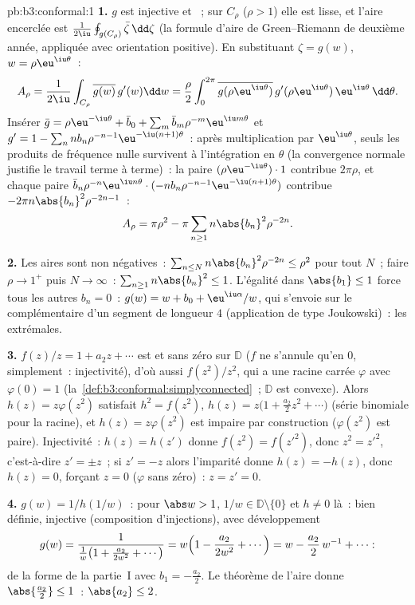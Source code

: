 \begin{solution}{pb:b3:conformal:1}
\textbf{1.} $g$ est injective et ~; sur $C_\rho$
($\rho > 1$) elle est lisse, et l'aire encerclée est
$\frac1{2\iu}\oint_{g(C_\rho)}\bar\zeta\,\dd\zeta$ (la
formule d'aire de Green--Riemann de deuxième année,
appliquée avec orientation positive). En substituant $\zeta
= g(w)$, $w = \rho\eu^{\iu\theta}$~:
\[
A_\rho = \frac1{2\iu}\int_{C_\rho}\overline{g(w)}\,g'(w)\dd
w = \frac\rho2\int_0^{2\pi}\overline{g(\rho\eu^{\iu\theta})}
\,g'(\rho\eu^{\iu\theta})\,\eu^{\iu\theta}\,\dd\theta .
\]
Insérer $\bar g = \rho\eu^{-\iu\theta} + \bar b_0 +
\sum_m\bar b_m\rho^{-m}\eu^{\iu m\theta}$ et $g' = 1 -
\sum_nnb_n\rho^{-n-1}\eu^{-\iu(n+1)\theta}$~: après
multiplication par $\eu^{\iu\theta}$, seuls les produits de
fréquence nulle survivent à l'intégration en $\theta$ (la
convergence normale justifie le travail terme à terme)~: la
paire $(\rho\eu^{-\iu\theta})\cdot1$ contribue $2\pi\rho$,
et chaque paire $\bar b_n\rho^{-n}\eu^{\iu
n\theta}\cdot(-nb_n\rho^{-n-1}\eu^{-\iu(n+1)\theta})$
contribue $-2\pi n\abs{b_n}^2\rho^{-2n-1}$~:
\[
A_\rho = \pi\rho^2 - \pi\sum_{n\geq1}n\abs{b_n}^2\rho^{-2n}.
\]

\textbf{2.} Les aires sont non négatives~: $\sum_{n\leq
N}n\abs{b_n}^2\rho^{-2n} \leq \rho^2$ pour tout $N$~; faire
$\rho \to 1^+$ puis $N \to \infty$~:
$\sum_{n\geq1}n\abs{b_n}^2 \leq 1$. L'égalité dans
$\abs{b_1} \leq 1$ force tous les autres $b_n = 0$~: $g(w) =
w + b_0 + \eu^{\iu\alpha}/w$, qui s'envoie sur le
complémentaire d'un segment de longueur $4$ (application de
type Joukowski)~: les extrémales.

\textbf{3.} $f(z)/z = 1 + a_2z + \cdots$ est  et
sans zéro sur $\mathbb D$ ($f$ ne s'annule qu'en $0$,
simplement~: injectivité), d'où aussi $f(z^2)/z^2$, qui a
une racine carrée  $\varphi$ avec $\varphi(0) =
1$ (la~\cref{def:b3:conformal:simplyconnected}~; $\mathbb D$
est convexe). Alors $h(z) = z\varphi(z^2)$ satisfait $h^2 =
f(z^2)$, $h(z) = z\bigl(1 + \frac{a_2}2z^2 + \cdots\bigr)$
(série binomiale pour la racine), et $h(z) = z\varphi(z^2)$
est impaire par construction ($\varphi(z^2)$ est paire).
Injectivité~: $h(z) = h(z')$ donne $f(z^2) = f(z'^2)$, donc
$z^2 = z'^2$, c'est-à-dire $z' = \pm z$~; si $z' = -z$ alors
l'imparité donne $h(z) = -h(z)$, donc $h(z) = 0$, forçant
$z = 0$ ($\varphi$ sans zéro)~: $z = z' = 0$.

\textbf{4.} $g(w) = 1/h(1/w)$~: pour $\abs w > 1$, $1/w \in
\mathbb D\setminus\{0\}$ et $h \neq 0$ là~: bien définie,
injective (composition d'injections), avec développement
\[
g(w) = \frac{1}{\frac1w\bigl(1 + \frac{a_2}{2w^2} +
\cdots\bigr)} = w\Bigl(1 - \frac{a_2}{2w^2} + \cdots\Bigr)
= w - \frac{a_2}{2}\,w^{-1} + \cdots :
\]
de la forme de la partie~I avec $b_1 = -\frac{a_2}2$. Le
théorème de l'aire donne $\abs{\frac{a_2}2} \leq 1$~:
$\abs{a_2} \leq 2$.


\end{solution}
